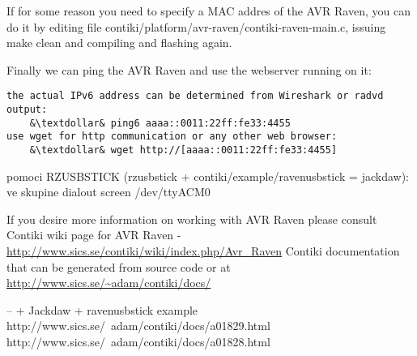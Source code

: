 \documentclass{article}
\begin{document}
If for some reason you need to specify a MAC addres of the AVR Raven, you can do it by editing file contiki/platform/avr-raven/contiki-raven-main.c,
issuing make clean and compiling and flashing again.


Finally we can ping the AVR Raven and use the webserver running on it:
\begin{lstlisting}
the actual IPv6 address can be determined from Wireshark or radvd output:
	&\textdollar& ping6 aaaa::0011:22ff:fe33:4455
use wget for http communication or any other web browser:
	&\textdollar& wget http://[aaaa::0011:22ff:fe33:4455]     
\end{lstlisting}
 


pomoci RZUSBSTICK (rzusbstick + contiki/example/ravenusbstick = jackdaw):
ve skupine dialout
screen /dev/ttyACM0



If you desire more information on working with AVR Raven please consult
Contiki wiki page for AVR Raven - \url{http://www.sics.se/contiki/wiki/index.php/Avr_Raven}
Contiki documentation that can be generated from source code or at \url{http://www.sics.se/~adam/contiki/docs/}

-- + Jackdaw + ravenusbstick example
http://www.sics.se/~adam/contiki/docs/a01829.html
http://www.sics.se/~adam/contiki/docs/a01828.html
\end{document}

